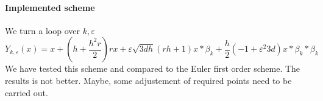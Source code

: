 \documentclass[a4paper,10pt]{article}
\begin{document}
\paragraph{Implemented scheme}
We turn a loop over $k,\varepsilon$
\begin{equation}
Y_{k,\varepsilon}(x) = x 
                     + (h + \frac{h^2r}{2}  ) rx
                     + \varepsilon \sqrt{3dh}(rh + 1 )  x*\beta_k
                     + \frac{h}{2}(-1 + \varepsilon^2 3d)x*\beta_k*\beta_k                     
\end{equation}
We have tested this scheme and compared to the Euler first order scheme. The results is not better. Maybe, some adjustement of required points need to be carried out.
\begin{figure}[ht]
\centering
{}
\quad
\subfigure[$\varphi(S^1,S^2) = (K- (S^1+S^2) )^+$]{
}
\end{figure}
\end{document}
